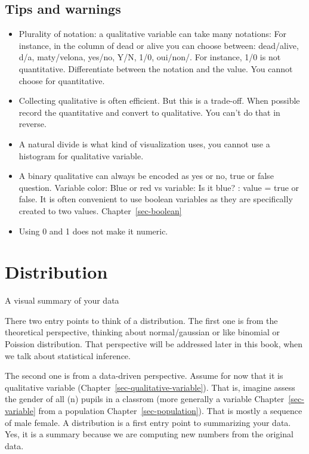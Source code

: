 \documentclass[
  letterpaper,
  DIV=11,
  numbers=noendperiod]{scrreprt}
\providecommand{\tightlist}{%
  \setlength{\itemsep}{0pt}\setlength{\parskip}{0pt}}
\begin{document}
\section*{Tips and warnings}\label{tips-and-warnings-10}


\begin{itemize}
\tightlist
\item
  Plurality of notation: a qualitative variable can take many notations:
  For instance, in the column of dead or alive you can choose between:
  dead/alive, d/a, maty/velona, yes/no, Y/N, 1/0, oui/non/. For
  instance, 1/0 is not quantitative. Differentiate between the notation
  and the value. You cannot choose for quantitative.
\item
  Collecting qualitative is often efficient. But this is a trade-off.
  When possible record the quantitative and convert to qualitative. You
  can't do that in reverse.
\item
  A natural divide is what kind of visualization uses, you cannot use a
  histogram for qualitative variable.
\item
  A binary qualitative can always be encoded as yes or no, true or false
  question. Variable color: Blue or red vs variable: Is it blue? : value
  = true or false. It is often convenient to use boolean variables as
  they are specifically created to two values. Chapter~\ref{sec-boolean}
\item
  Using 0 and 1 does not make it numeric.
\end{itemize}

\chapter{Distribution}\label{sec-distribution}

A visual summary of your data

There two entry points to think of a distribution. The first one is from
the theoretical perspective, thinking about normal/gaussian or like
binomial or Poission distribution. That perspective will be addressed
later in this book, when we talk about statistical inference.

The second one is from a data-driven perspective. Assume for now that it
is qualitative variable (Chapter~\ref{sec-qualitative-variable}). That
is, imagine assess the gender of all (n) pupils in a classrom (more
generally a variable Chapter~\ref{sec-variable} from a population
Chapter~\ref{sec-population}). That is mostly a sequence of male female.
A distribution is a first entry point to summarizing your data. Yes, it
is a summary because we are computing new numbers from the original
data.
\end{document}
